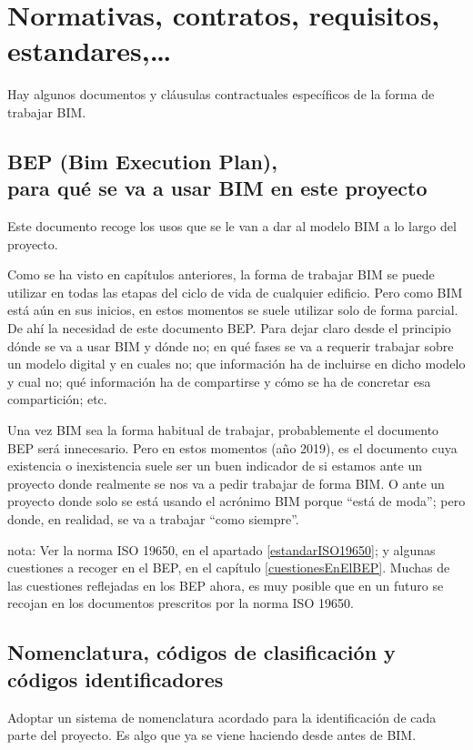 \documentclass[spanish,12pt,a4paper,final,oneside]{book}
\begin{document}
\chapter{Normativas, contratos, requisitos, estandares,\ldots}
Hay algunos documentos y cláusulas contractuales específicos de la forma de trabajar BIM.

\section{BEP (Bim Execution Plan),\\para qué se va a usar BIM en este proyecto}
Este documento recoge los usos que se le van a dar al modelo BIM a lo largo del proyecto.

Como se ha visto en capítulos anteriores, la forma de trabajar BIM se puede utilizar en todas las etapas del ciclo de vida de cualquier edificio. Pero como BIM está aún en sus inicios, en estos momentos se suele utilizar solo de forma parcial. De ahí la necesidad de este documento BEP. Para dejar claro desde el principio dónde se va a usar BIM y dónde no; en qué fases se va a requerir trabajar sobre un modelo digital y en cuales no; que información ha de incluirse en dicho modelo y cual no; qué información ha de compartirse y cómo se ha de concretar esa compartición; etc.

Una vez BIM sea la forma habitual de trabajar, probablemente el documento BEP será innecesario.  Pero en estos momentos (año 2019), es el documento cuya existencia o inexistencia suele ser un buen indicador de si estamos ante un proyecto donde realmente se nos va a pedir trabajar de forma BIM. O ante un proyecto donde solo se está usando el acrónimo BIM porque ``está de moda''; pero donde, en realidad, se va a trabajar ``como siempre''.

nota: Ver la norma ISO 19650, en el apartado \ref{estandarISO19650}; y algunas cuestiones a recoger en el BEP, en el capítulo \ref{cuestionesEnElBEP}. Muchas de las cuestiones reflejadas en los BEP ahora, es muy posible que en un futuro se recojan en los documentos prescritos por la norma ISO 19650.

\section{Nomenclatura, códigos de clasificación y códigos identificadores}
Adoptar un sistema de nomenclatura acordado para la identificación de cada parte del proyecto. Es algo que ya se viene haciendo desde antes de BIM.
\end{document}
